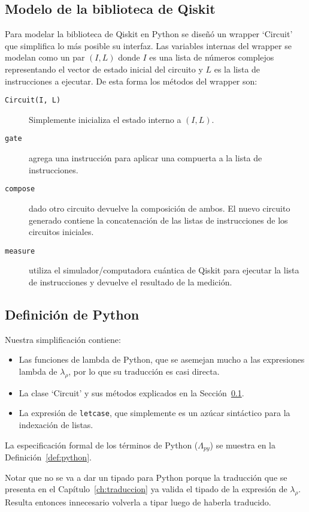 \subsection{Modelo de la biblioteca de Qiskit}\label{sub:qiskit_model}
Para modelar la biblioteca de Qiskit en Python se diseñó un wrapper `Circuit' que simplifica lo más posible su interfaz. Las variables internas del wrapper se modelan como un par $(I, L)$ donde $I$ es una lista de números complejos representando el vector de estado inicial del circuito y $L$ es la lista de instrucciones a ejecutar. De esta forma los métodos del wrapper son:
\begin{description}
    \item[\texttt{Circuit(I, L)}] Simplemente inicializa el estado interno a $(I, L)$.
    \item[\texttt{gate}] agrega una instrucción para aplicar una compuerta a la lista de instrucciones.
    \item[\texttt{compose}] dado otro circuito devuelve la composición de ambos. El nuevo circuito generado contiene la concatenación de las listas de instrucciones de los circuitos iniciales.
    \item[\texttt{measure}] utiliza el simulador/computadora cuántica de Qiskit para ejecutar la lista de instrucciones y devuelve el resultado de la medición.
    
\end{description} 


\subsection{Definición de Python}

Nuestra simplificación contiene:
\begin{itemize}
    \item Las funciones de lambda de Python, que se asemejan mucho a las expresiones lambda de $\lambda_\rho$, por lo que su traducción es casi directa.
    \item La clase `Circuit' y sus métodos explicados en la Sección~\ref{sub:qiskit_model}.
    \item La expresión de \texttt{letcase}, que simplemente es un azúcar sintáctico para la indexación de listas.
\end{itemize}

La especificación formal de los términos de Python ($\Lambda_\textit{py}$) se muestra en la Definición~\ref{def:python}.

Notar que no se va a dar un tipado para Python porque la traducción que se presenta en el Capítulo~\ref{ch:traduccion} ya valida el tipado de la expresión de $\lambda_\rho$. Resulta entonces innecesario volverla a tipar luego de haberla traducido.

